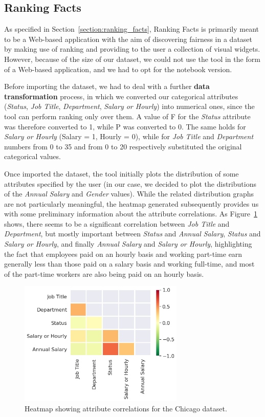 \subsection{Ranking Facts}
As specified in Section~\ref{section:ranking_facts}, Ranking Facts is primarily meant to be a Web-based application with the aim of discovering fairness in a dataset by making use of ranking and providing to the user a collection of visual widgets. However, because of the size of our dataset, we could not use the tool in the form of a Web-based application, and we had to opt for the notebook version.

Before importing the dataset, we had to deal with a further \textbf{data transformation} process, in which we converted our categorical attributes (\textit{Status}, \textit{Job Title}, \textit{Department}, \textit{Salary or Hourly}) into numerical ones, since the tool can perform ranking only over them. A value of F for the \textit{Status} attribute was therefore converted to 1, while P was converted to 0. The same holds for \textit{Salary or Hourly} (Salary = 1, Hourly = 0), while for \textit{Job Title} and \textit{Department} numbers from 0 to 35 and from 0 to 20 respectively substituted the original categorical values.

Once imported the dataset, the tool initially plots the distribution of some attributes specified by the user (in our case, we decided to plot the distributions of the \textit{Annual Salary} and \textit{Gender} values). While the related distribution graphs are not particularly meaningful, the heatmap generated subsequently provides us with some preliminary information about the attribute correlations. As Figure~\ref{fig:chicago_rankingfacts1} shows, there seems to be a significant correlation between \textit{Job Title} and \textit{Department}, but mostly important between \textit{Status} and \textit{Annual Salary}, \textit{Status} and \textit{Salary or Hourly}, and finally \textit{Annual Salary} and \textit{Salary or Hourly}, highlighting the fact that employees paid on an hourly basis and working part-time earn generally less than those paid on a salary basis and working full-time, and most of the part-time workers are also being paid on an hourly basis.

\begin{figure}[t!]
\centering
\includegraphics[width=0.7\textwidth]{figures/chicago_rankingfacts1.png}
\caption{Heatmap showing attribute correlations for the Chicago dataset.}
\label{fig:chicago_rankingfacts1}
\end{figure}

